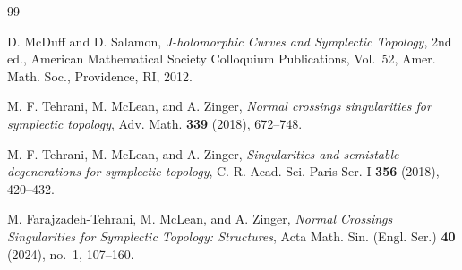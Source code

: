 \documentclass[11pt]{article}
\theoremstyle{remark}
\begin{document}
\begin{thebibliography}{99}

D. McDuff and D. Salamon,
\emph{J-holomorphic Curves and Symplectic Topology},
2nd ed.,
American Mathematical Society Colloquium Publications, Vol.~52,
Amer. Math. Soc., Providence, RI, 2012.

M. F. Tehrani, M. McLean, and A. Zinger,
\emph{Normal crossings singularities for symplectic topology},
Adv. Math. \textbf{339} (2018), 672--748.

M. F. Tehrani, M. McLean, and A. Zinger,
\emph{Singularities and semistable degenerations for symplectic topology},
C. R. Acad. Sci. Paris Ser. I \textbf{356} (2018), 420--432.

M. Farajzadeh-Tehrani, M. McLean, and A. Zinger,
\emph{Normal Crossings Singularities for Symplectic Topology: Structures},
Acta Math. Sin. (Engl. Ser.) \textbf{40} (2024), no.~1, 107--160.

\end{thebibliography}
\end{document}
